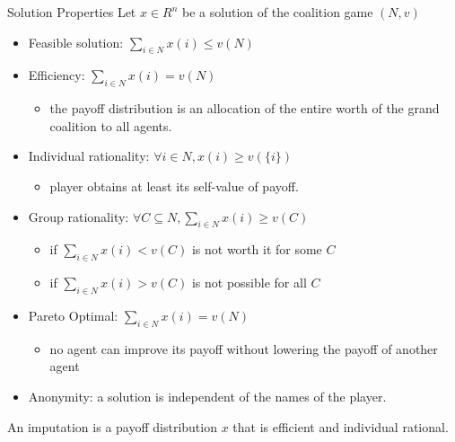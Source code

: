 \documentclass{beamer}
\begin{document}
\begin{frame}{Solution Properties}
    Let $x \in R^n$ be a solution of the coalition game $(N,v)$
    \begin{itemize}
        \item {\color{blue} Feasible solution:} $\sum_{i \in N} x(i) \leq v(N)$
        \item {\color{blue} Efficiency:} $\sum_{i \in N} x(i) = v(N)$
        \begin{itemize}
            \item the payoff distribution is an allocation of the entire worth of the grand coalition to all agents.
        \end{itemize}
        \item {\color{blue} Individual rationality:} $\forall i \in N, x(i) \geq v(\{i\})$
        \begin{itemize}
            \item player obtains at least its self-value of payoff.
        \end{itemize}
        \item {\color{blue} Group rationality:} $\forall C \subseteq N, \sum_{i \in N} x(i) \geq v(C)$
        \begin{itemize}
            \item if $\sum_{i \in N} x(i) < v(C)$ is not worth it for some $C$
            \item if $\sum_{i \in N} x(i) > v(C)$ is not possible for all $C$
        \end{itemize}
        \item {\color{blue} Pareto Optimal:} $\sum_{i \in N} x(i) = v(N)$
        \begin{itemize}
            \item no agent can improve its payoff without lowering the payoff of another agent
        \end{itemize}
        \item {\color{blue} Anonymity:} a solution is independent of the names of the player.
    \end{itemize}

    \vspace{0.2cm}

    An {\color{blue} imputation} is a payoff distribution $x$ that is efficient and individual rational.

\end{frame}
\end{document}
